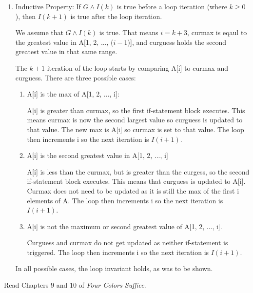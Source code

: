 \documentclass{article}
\begin{document}
\begin{enumerate}
\begin{enumerate}
	\item Inductive Property: If $G \land I(k)$ is true before a loop iteration (where $k \geq 0$), then $I(k+1)$ is true after the loop iteration.
	
	We assume that $G \land I(k)$ is true. That means $i = k+3$, curmax is eqaul to the greatest value in A[1, 2, ..., ($i-1$)], and curguess holds the second greatest value in that same range.
	
	The $k+1$ iteration of the loop starts by comparing A[i] to curmax and curguess. There are three possible cases:
	
	\begin{enumerate}
	\item A[i] is the max of A[1, 2, ..., i]:
	
	A[i] is greater than curmax, so the first if-statement block executes. This means curmax is now the second largest value so curguess is updated to that value. 
	The new max is A[i] so curmax is set to that value. The loop then increments i so the next iteration is $I(i+1)$.
	
	\item A[i] is the second greatest value in A[1, 2, ..., i]
	
	A[i] is less than the curmax, but is greater than the curgess, so the second if-statement block executes. This means that curguess is updated to A[i]. 
	Curmax does not need to be updated as it is still the max of the first i elements of A. The loop then increments i so the next iteration is $I(i+1)$.
	
	\item A[i] is not the maximum or second greatest value of A[1, 2, ..., i].
	
	Curguess and curmax do not get updated as neither if-statement is triggered.  The loop then increments i so the next iteration is $I(i+1)$.
\end{enumerate}


	In all possible cases, the loop invariant holds, as was to be shown.
\end{enumerate}
\end{enumerate}



 

Read Chapters $9$ and $10$ of \emph{Four Colors Suffice}.
\end{document}

